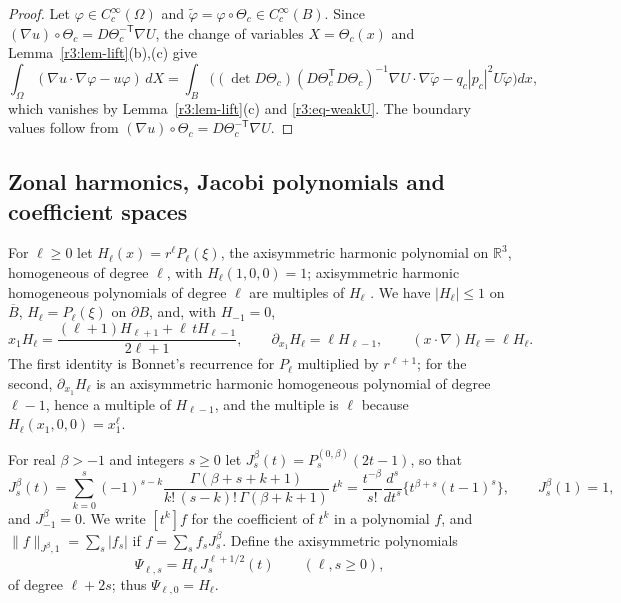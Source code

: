 \documentclass[11pt]{amsart}
\theoremstyle{definition}
\theoremstyle{remark}
\numberwithin{equation}{section}
\newcommand{\R}{\mathbb{R}}
\newcommand{\nrm}[1]{\lVert #1\rVert}
\begin{document}
\begin{proof}
Let $\varphi\in C_c^\infty(\Omega)$ and $\tilde\varphi=\varphi\circ\Theta_c\in C_c^\infty(B)$. Since $(\nabla u)\circ\Theta_c=D\Theta_c^{-\mathsf T}\nabla U$, the change of variables $X=\Theta_c(x)$ and Lemma~\ref{r3:lem-lift}(b),(c) give
\[
\int_\Omega(\nabla u\cdot\nabla\varphi-u\varphi)\,dX=\int_B\Big((\det D\Theta_c)(D\Theta_c^{\mathsf T}D\Theta_c)^{-1}\nabla U\cdot\nabla\tilde\varphi-q_c|p_c|^2U\tilde\varphi\Big)dx,
\]
which vanishes by Lemma~\ref{r3:lem-lift}(c) and \eqref{r3:eq-weakU}. The boundary values follow from $(\nabla u)\circ\Theta_c=D\Theta_c^{-\mathsf T}\nabla U$.
\end{proof}

\subsection{Zonal harmonics, Jacobi polynomials and coefficient spaces}\label{r3:sec-spaces}

For $\ell\geq0$ let $H_\ell(x)=r^\ell P_\ell(\xi)$, the axisymmetric harmonic polynomial on $\R^3$, homogeneous of degree $\ell$, with $H_\ell(1,0,0)=1$; axisymmetric harmonic homogeneous polynomials of degree $\ell$ are multiples of $H_\ell$ \cite[Ch.~IV]{SW71}. We have $|H_\ell|\leq1$ on $\overline B$, $H_\ell=P_\ell(\xi)$ on $\partial B$, and, with $H_{-1}=0$,
\begin{equation}\label{r3:eq-Hrec}
x_1H_\ell=\frac{(\ell+1)H_{\ell+1}+\ell\,tH_{\ell-1}}{2\ell+1},\qquad \partial_{x_1}H_\ell=\ell H_{\ell-1},\qquad (x\cdot\nabla)H_\ell=\ell H_\ell .
\end{equation}
The first identity is Bonnet's recurrence for $P_\ell$ multiplied by $r^{\ell+1}$; for the second, $\partial_{x_1}H_\ell$ is an axisymmetric harmonic homogeneous polynomial of degree $\ell-1$, hence a multiple of $H_{\ell-1}$, and the multiple is $\ell$ because $H_\ell(x_1,0,0)=x_1^\ell$.

For real $\beta>-1$ and integers $s\geq0$ let $J^\beta_s(t)=P^{(0,\beta)}_s(2t-1)$, so that
\begin{equation}\label{r3:eq-Jcoef}
J^\beta_s(t)=\sum_{k=0}^s(-1)^{s-k}\frac{\Gamma(\beta+s+k+1)}{k!\,(s-k)!\,\Gamma(\beta+k+1)}\,t^k=\frac{t^{-\beta}}{s!}\frac{d^s}{dt^s}\big\{t^{\beta+s}(t-1)^s\big\},\qquad J^\beta_s(1)=1,
\end{equation}
and $J^\beta_{-1}=0$. We write $[t^k]f$ for the coefficient of $t^k$ in a polynomial $f$, and $\nrm f_{J^\beta,1}=\sum_s|f_s|$ if $f=\sum_sf_sJ^\beta_s$. Define the axisymmetric polynomials
\[
\Psi_{\ell,s}=H_\ell\,J^{\ell+1/2}_s(t)\qquad(\ell,s\geq0),
\]
of degree $\ell+2s$; thus $\Psi_{\ell,0}=H_\ell$.
\end{document}
